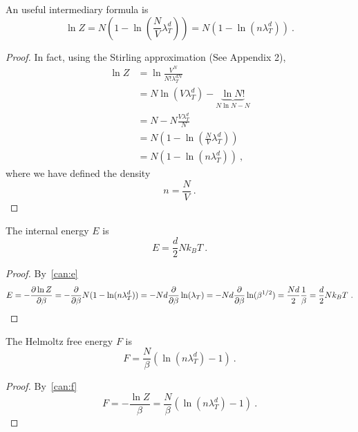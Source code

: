     An useful intermediary formula is 
    \begin{equation*}
        \ln Z = N (1 - \ln (\frac{N}{V} \lambda_T^d)) = N (1 - \ln (n \lambda_T^d)) ~.
    \end{equation*}
    \begin{proof}
        In fact, using the Stirling approximation (See Appendix 2),
        \begin{equation*}
        \begin{aligned}
            \ln Z & = \ln \frac{V^N}{N! \lambda^{dN}_T} \\ & = N \ln (V \lambda_T^d) - \underbrace{\ln N!}_{N \ln N - N} \\ & = N - N \frac{V \lambda_T^d}{N} \\ & = N (1 - \ln (\frac{N}{V} \lambda_T^d)) \\ & = N (1 - \ln (n \lambda_T^d))  ~,
        \end{aligned}
        \end{equation*}
        where we have defined the density
        \begin{equation*}
            n = \frac{N}{V} ~.
        \end{equation*}
    \end{proof}
    
    The internal energy $E$ is 
    \begin{equation*}
        E = \frac{d}{2} N k_B T ~.
    \end{equation*}
    \begin{proof}
        By~\eqref{can:e}
        \begin{equation*}
            E = - \frac{\partial\ln Z}{\partial\beta} = - \frac{\partial}{\partial\beta} N (1 - \ln (n \lambda_T^d)) = - Nd \frac{\partial}{\partial\beta} \ln (\lambda_T) = - Nd \frac{\partial}{\partial\beta} \ln (\beta^{1/2}) = \frac{Nd}{2} \frac{1}{\beta} = \frac{d}{2} N k_B T ~.
        \end{equation*}
    \end{proof}
    
    The Helmoltz free energy $F$ is 
    \begin{equation*}
        F = \frac{N}{\beta} (\ln (n \lambda_T^d) - 1) ~.
    \end{equation*}
    \begin{proof}
        By~\eqref{can:f}
        \begin{equation*}
            F = - \frac{\ln Z}{\beta} = \frac{N}{\beta} (\ln (n \lambda_T^d) - 1) ~.
        \end{equation*}
    \end{proof}
    
